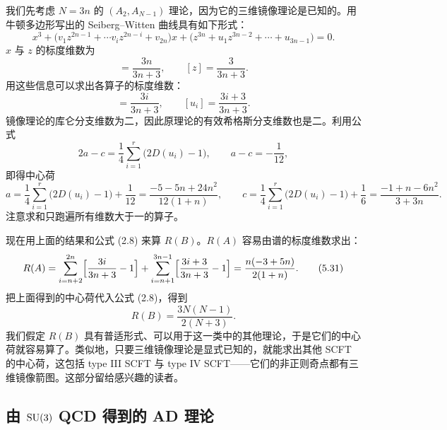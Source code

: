我们先考虑 $N=3n$ 的 $(A_2,A_{N-1})$ 理论，因为它的三维镜像理论是已知的。用牛顿多边形写出的 Seiberg--Witten 曲线具有如下形式：
\begin{equation}
x^3 + \bigl(v_1z^{2n-1} + \cdots v_iz^{2n-i} + v_{2n}\bigr)x
+ \bigl(z^{3n} + u_1z^{3n-2} + \cdots + u_{3n-1}\bigr) = 0 .
\label{eq:5.26}\tag{5.26}
\end{equation}
$x$ 与 $z$ 的标度维数为
\begin{equation}
[x] = \frac{3n}{3n+3},\qquad [z] = \frac{3}{3n+3}.
\label{eq:5.27}\tag{5.27}
\end{equation}
用这些信息可以求出各算子的标度维数：
\begin{equation}
[v_i] = \frac{3i}{3n+3},\qquad [u_i] = \frac{3i+3}{3n+3}.
\label{eq:5.28}\tag{5.28}
\end{equation}
镜像理论的库仑分支维数为二，因此原理论的有效希格斯分支维数也是二。利用公式
\begin{equation}
2a-c = \frac{1}{4}\sum_{i=1}^{r}\bigl(2D(u_i)-1\bigr),\qquad
a-c = -\frac{1}{12},
\label{eq:5.29}\tag{5.29}
\end{equation}
即得中心荷
\begin{equation}
a = \frac{1}{4}\sum_{i=1}^{r}\bigl(2D(u_i)-1\bigr) + \frac{1}{12}
= \frac{-5-5n+24n^2}{12(1+n)},\qquad
c = \frac{1}{4}\sum_{i=1}^{r}\bigl(2D(u_i)-1\bigr) + \frac{1}{6}
= \frac{-1+n-6n^2}{3+3n}.
\label{eq:5.30}\tag{5.30}
\end{equation}
注意求和只跑遍所有维数大于一的算子。

现在用上面的结果和公式 (2.8) 来算 $R(B)$。$R(A)$ 容易由谱的标度维数求出：
\begin{equation}
R(A) = \sum_{i=n+2}^{2n}\Bigl[\frac{3i}{3n+3}-1\Bigr]
+ \sum_{i=n+1}^{3n-1}\Bigl[\frac{3i+3}{3n+3}-1\Bigr]
= \frac{n(-3+5n)}{2(1+n)} .
\label{eq:5.31}\tag{5.31}
\end{equation}
把上面得到的中心荷代入公式 (2.8)，得到
\begin{equation}
R(B) = \frac{3N(N-1)}{2(N+3)} .
\label{eq:5.32}\tag{5.32}
\end{equation}
我们假定 $R(B)$ 具有普适形式、可以用于这一类中的其他理论，于是它们的中心荷就容易算了。类似地，只要三维镜像理论是显式已知的，就能求出其他 SCFT 的中心荷，这包括 type III SCFT 与 type IV SCFT——它们的非正则奇点都有三维镜像箭图。这部分留给感兴趣的读者。

\subsection{由 $\operatorname{SU}(3)$ QCD 得到的 AD 理论}
\label{sec:5.4}

